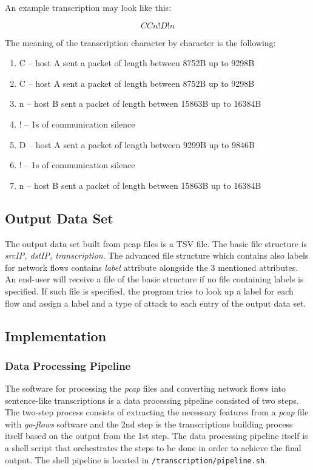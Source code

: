 \documentclass{article}
\begin{document}
\noindent An example transcription may look like this:

$$ CCn!D!n $$

\noindent The meaning of the transcription character by character is the following:

\begin{enumerate}
    \item C -- host A sent a packet of length between 8752B up to 9298B
    \item C -- host A sent a packet of length between 8752B up to 9298B
    \item n -- host B sent a packet of length between 15863B up to 16384B
    \item ! -- 1s of communication silence
    \item D -- host A sent a packet of length between 9299B up to 9846B
    \item ! -- 1s of communication silence
    \item n -- host B sent a packet of length between 15863B up to 16384B
\end{enumerate}


\subsection{Output Data Set}

The output data set built from pcap files is a TSV file. The basic file structure is \textit{srcIP, dstIP, transcription}. The advanced file structure which contains also labels for network flows contains \textit{label} attribute alongside the 3 mentioned attributes. An end-user will receive a file of the basic structure if no file containing labels is specified. If such file is specified, the program tries to look up a label for each flow and assign a label and a type of attack to each entry of the output data set.



\subsection{Implementation}

\subsubsection{Data Processing Pipeline}
The software for processing the \textit{pcap} files and converting network flows into sentence-like transcriptions is a data processing pipeline consisted of two steps. The two-step process consists of extracting the necessary features from a \textit{pcap} file with \textit{go-flows} software \cite{goflows-reference} and the 2nd step is the transcriptions building process itself based on the output from the 1st step. The data processing pipeline itself is a shell script that orchestrates the steps to be done in order to achieve the final output. The shell pipeline is located in \verb|/transcription/pipeline.sh|.
\end{document}

